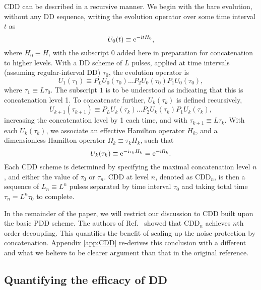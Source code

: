 \documentclass[twocolumn,pra,superscriptaddress]{revtex4-2}
\newcommand{\CDDn}{\mathrm{CDD}_n}
\begin{document}
CDD can be described in a recursive manner. We begin with the bare evolution, without any DD sequence, writing the evolution operator over some time interval $t$ as
\begin{equation}
U_0(t)\equiv \mathrm{e}^{-\mathrm{i} t H_0},
\end{equation}
where $H_0\equiv H$, with the subscript $0$ added here in preparation for concatenation to higher levels. With a DD scheme of $L$ pulses, applied at time intervals (assuming regular-interval DD) $\tau_0$, the evolution operator is
\begin{equation}
U_1(\tau_1)\equiv P_LU_0(\tau_0)\ldots P_2U_0(\tau_0)P_1U_0(\tau_0),
\end{equation}
where $\tau_1\equiv L\tau_0$. The subscript $1$ is to be understood as indicating that this is concatenation level 1. To concatenate further, $U_k(\tau_k)$ is defined recursively, 
\begin{equation}
U_{k+1}(\tau_{k+1})\equiv P_LU_k(\tau_k)\ldots P_2U_k(\tau_k)P_1U_k(\tau_k),
\end{equation}
increasing the concatenation level by 1 each time, and with $\tau_{k+1}\equiv L\tau_k$. With each $U_k(\tau_k)$, we associate an effective Hamilton operator $H_k$, and a dimensionless Hamilton operator $\Omega_k\equiv\tau_kH_k$, such that 
\begin{equation}
U_k(\tau_k)\equiv \mathrm{e}^{-\mathrm{i}\tau_k H_k}=\mathrm{e}^{-\mathrm{i}\Omega_k}.
\end{equation}
Each CDD scheme is determined by specifying the maximal concatenation level $n$, and either the value of $\tau_0$ or $\tau_n$. CDD at level $n$, denoted as $\CDDn$, is then a sequence of $L_n\equiv L^n$ pulses separated by time interval $\tau_0$ and taking total time $\tau_n=L^n\tau_0$ to complete.

In the remainder of the paper, we will restrict our discussion to CDD built upon the basic PDD scheme. The authors of Ref.~\cite{khodjasteh2005fault} showed that $\CDDn$ achieves $n$th order decoupling. This quantifies the benefit of scaling up the noise protection by concatenation. Appendix \ref{app:CDD} re-derives this conclusion with a different and what we believe to be clearer argument than that in the original reference. 



\subsection{Quantifying the efficacy of DD}
\end{document}
